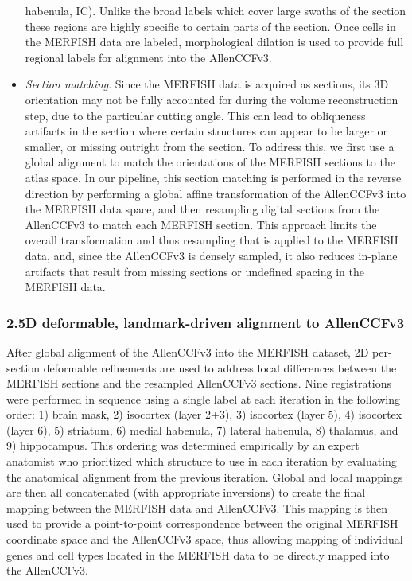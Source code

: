 \documentclass[
  12pt,
]{article}
\begin{document}
\begin{itemize}
  habenula, IC). Unlike the broad labels which cover large swaths of the
  section these regions are highly specific to certain parts of the
  section. Once cells in the MERFISH data are labeled, morphological
  dilation is used to provide full regional labels for alignment into
  the AllenCCFv3.
\item
  \emph{Section matching}. Since the MERFISH data is acquired as
  sections, its 3D orientation may not be fully accounted for during the
  volume reconstruction step, due to the particular cutting angle. This
  can lead to obliqueness artifacts in the section where certain
  structures can appear to be larger or smaller, or missing outright
  from the section. To address this, we first use a global alignment to
  match the orientations of the MERFISH sections to the atlas space. In
  our pipeline, this section matching is performed in the reverse
  direction by performing a global affine transformation of the
  AllenCCFv3 into the MERFISH data space, and then resampling digital
  sections from the AllenCCFv3 to match each MERFISH section. This
  approach limits the overall transformation and thus resampling that is
  applied to the MERFISH data, and, since the AllenCCFv3 is densely
  sampled, it also reduces in-plane artifacts that result from missing
  sections or undefined spacing in the MERFISH data.
\end{itemize}

\hypertarget{d-deformable-landmark-driven-alignment-to-allenccfv3}{%
\subsubsection{2.5D deformable, landmark-driven alignment to
AllenCCFv3}\label{d-deformable-landmark-driven-alignment-to-allenccfv3}}

After global alignment of the AllenCCFv3 into the MERFISH dataset, 2D
per-section deformable refinements are used to address local differences
between the MERFISH sections and the resampled AllenCCFv3 sections. Nine
registrations were performed in sequence using a single label at each
iteration in the following order: 1) brain mask, 2) isocortex (layer
2+3), 3) isocortex (layer 5), 4) isocortex (layer 6), 5) striatum, 6)
medial habenula, 7) lateral habenula, 8) thalamus, and 9) hippocampus.
This ordering was determined empirically by an expert anatomist who
prioritized which structure to use in each iteration by evaluating the
anatomical alignment from the previous iteration. Global and local
mappings are then all concatenated (with appropriate inversions) to
create the final mapping between the MERFISH data and AllenCCFv3. This
mapping is then used to provide a point-to-point correspondence between
the original MERFISH coordinate space and the AllenCCFv3 space, thus
allowing mapping of individual genes and cell types located in the
MERFISH data to be directly mapped into the AllenCCFv3.
\end{document}
